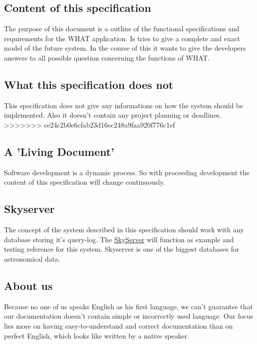 \subsection*{Content of this specification}
The purpose of this document is a outline of the functional specifications and requirements
for the WHAT application. Is tries to give a complete and exact model of the future system.
In the course of this it wants to give the developers answers to all possible question concerning
the functions of WHAT.


\subsection*{What this specification does not}
This specification does not give any informations on how the system should be implemented. Also it doesn't 
contain any project planning or deadlines.
>>>>>>> ce24c2b0e6cfab23d16ec248a9faa920f776c1ef


\subsection*{A 'Living Document'}
Software development is a dynamic process. So with proceeding development the
content of this specification will change continuously. 


\subsection*{Skyserver}
The concept of the system described in this specification should work with any database
storing it's query-log. The \href{http://skyserver.sdss.org/public/en/}{SkyServer} will function
as example and testing reference for this system. Skyserver is one of the biggest databases for astronomical data.

\subsection*{About us}
Because no one of us speaks English as his first language,
we can't guarantee that our documentation doesn't contain simple
or incorrectly used language. Our focus lies more on
having easy-to-understand and correct documentation
than on perfect English, which looks like written by a native speaker.

